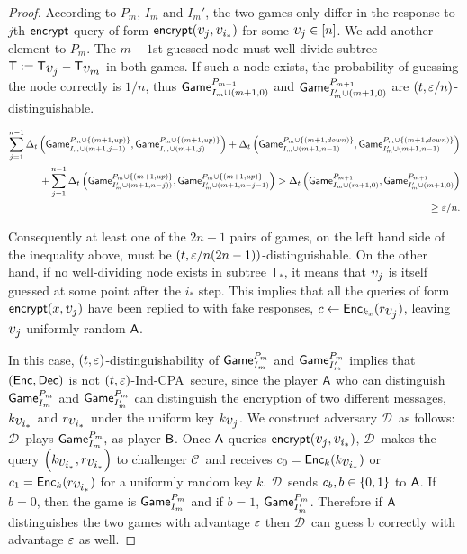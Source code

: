 \documentclass{article}
\newcommand{\tcpa}{$(t,\eps)$-Ind-CPA}
\def\B{{\sf B}}
\def\A{{\sf A}}
\def\a {${\mathcal D}$}
\def\ch {${\mathcal C}$}
\newcommand{\encrypt}{{\sf encrypt}}
\newcommand{\game}{{\sf Game}}
\newcommand{\T}{{\mathsf T}}
\newcommand{\dgg}[2]{\game_{#1}^{#2}}
\newcommand{\bigv}[1]{\mbox{\large $v_{#1}$}}
\begin{document}
\begin{proof}
According to $P_m$, $I_m$ and $I_m'$, the two games only differ in the response to $j$th $\encrypt$ query of form $\encrypt(\bigv{j},\bigv{i_*})$ for some $\bigv{j}\in[n]$. We add another element to $P_{m}$. The $m+1$st guessed node must well-divide subtree $\T:=\T_{\bigv{j}}- \T_{\bigv{m}}$ in both games. If such a node exists, the probability of guessing the node correctly is $1/n$, thus $\dgg{I_m\cup (m+1,0)}{P_{m+1}}$ and $\dgg{I'_m\cup (m+1,0) }{P_{m+1}}$ are $(t,\varepsilon/n)$-distinguishable.


\begin{align*}
\sum_{j=1}^{n-1} \dElta{\dgg{I_m\cup (m+1,j-1)}{P_m\cup \cub{(m+1, up)}},\dgg{I_m\cup (m+1,j)}{P_m\cup \cub{(m+1, up)}}}+ \dElta{\dgg{I_m\cup (m+1,n-1)}{P_m\cup \cub{(m+1, down)}},\dgg{I'_m\cup (m+1,n-1)}{P_m\cup \cub{(m+1, down)}}} \\+ \sum_{j=1}^{n-1} \dElta{\dgg{I'_m\cup (m+1,n-j))}{P_m\cup \cub{(m+1, up)}},\dgg{I'_m\cup (m+1,n-j-1)}{P_m\cup \cub{(m+1, up)}}}
> \dElta{\dgg{I_m\cup (m+1,0)}{P_{m+1}},\dgg{I'_m\cup (m+1,0) }{P_{m+1}}}\\ \geq \eps/n.
\end{align*}

Consequently at least one of the $2n-1$ pairs of games, on the left hand side of the inequality above, must be $(t,\varepsilon/n(2n-1))$-distinguishable. On the other hand, if no well-dividing node exists in subtree $\T_*$, it means that $\bigv{j}$ is itself guessed at some point after the $i_*$ step. This implies that all the queries of form $\encrypt(x,\bigv{j})$ have been replied to with fake responses, $c\leftarrow \Enc_{k_x}(r_{\bigv{j}})$, leaving $\bigv{j}$ uniformly random $\A$. 

In this case, $(t,\varepsilon)$-distinguishability of $\dgg{I_m}{P_m}$ and $\dgg{I'_m}{P_m}$ implies that $({\sf Enc},{\sf Dec})$ is not \tcpa~secure, since the player $\A$ who can distinguish $\dgg{I_m}{P_m}$ and $\dgg{I'_m}{P_m}$ can distinguish the encryption of two different messages, $k_{\bigv{i_*}}$ and $r_{\bigv{i_*}}$ under the uniform key $k_{\bigv{j}}$. 
We construct adversary \a~as follows: \a~plays $\dgg{I_m}{P_m},$ as player $\B$. Once $\A$ queries $\encrypt(\bigv{j},\bigv{i_*})$, \a~makes the query $\rob{k_{\bigv{i_*}},r_{\bigv{i_*}}}$ to challenger \ch~and receives $c_0= \Enc_k(k_{\bigv{i_*}})$ or $c_1= \Enc_k(r_{\bigv{i_*}})$ for a uniformly random key $k$. \a~sends $c_b, b\in\{0,1\}$ to $\A$. If $b=0$, then the game is $\dgg{I_m}{P_m}$ and if $b=1$, $\dgg{I'_m}{P_m}$. Therefore if $\A$ distinguishes the two games with advantage $\varepsilon$ then \a~can guess b correctly with advantage $\varepsilon$ as well.


\end{proof}
\end{document}

